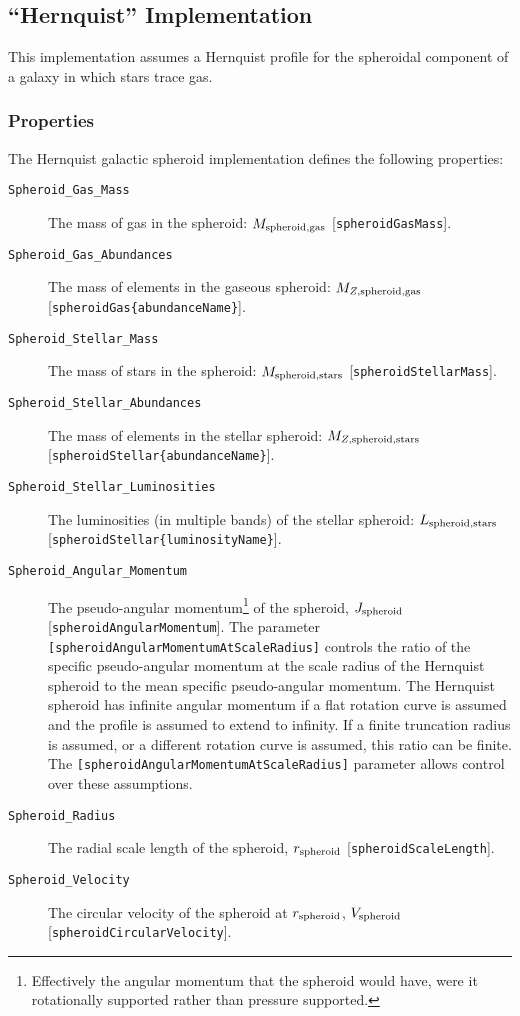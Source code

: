 \subsection{``Hernquist'' Implementation}

This implementation assumes a Hernquist profile \citep{hernquist_analytical_1990} for the spheroidal \gls{component} of a galaxy in which stars trace gas.

\subsubsection{Properties}

The Hernquist galactic spheroid implementation defines the following properties:
\begin{description}
 \item [{\tt Spheroid\_Gas\_Mass}] The mass of gas in the spheroid: $M_{\rm spheroid, gas}$ [{\tt spheroidGasMass}].
 \item [{\tt Spheroid\_Gas\_Abundances}] The mass of elements in the gaseous spheroid: $M_{Z, {\rm spheroid, gas}}$ [{\tt spheroidGas\{abundanceName\}}].
 \item [{\tt Spheroid\_Stellar\_Mass}] The mass of stars in the spheroid: $M_{\rm spheroid, stars}$ [{\tt spheroidStellarMass}].
 \item [{\tt Spheroid\_Stellar\_Abundances}] The mass of elements in the stellar spheroid: $M_{Z, {\rm spheroid, stars}}$ [{\tt spheroidStellar\{abundanceName\}}].
 \item [{\tt Spheroid\_Stellar\_Luminosities}] The luminosities (in multiple bands) of the stellar spheroid: $L_{\rm spheroid, stars}$ [{\tt spheroidStellar\{luminosityName\}}].
 \item [{\tt Spheroid\_Angular\_Momentum}] The pseudo-angular momentum\footnote{Effectively the angular momentum that the spheroid would have, were it rotationally supported rather than pressure supported.} of the spheroid, $J_{\rm spheroid}$ [{\tt spheroidAngularMomentum}]. The parameter {\tt [spheroidAngularMomentumAtScaleRadius]} controls the ratio of the specific pseudo-angular momentum at the scale radius of the Hernquist spheroid to the mean specific pseudo-angular momentum. The Hernquist spheroid has infinite angular momentum if a flat rotation curve is assumed and the profile is assumed to extend to infinity. If a finite truncation radius is assumed, or a different rotation curve is assumed, this ratio can be finite. The {\tt [spheroidAngularMomentumAtScaleRadius]} parameter allows control over these assumptions.
 \item [{\tt Spheroid\_Radius}] The radial scale length of the spheroid, $r_{\rm spheroid}$ [{\tt spheroidScaleLength}].
 \item [{\tt Spheroid\_Velocity}] The circular velocity of the spheroid at $r_{\rm spheroid}$, $V_{\rm spheroid}$ [{\tt spheroidCircularVelocity}].
\end{description}
